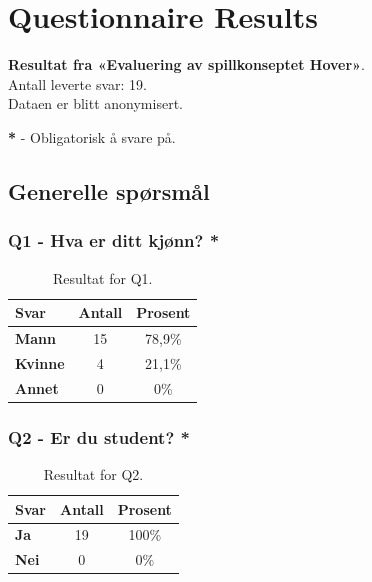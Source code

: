 \section{Questionnaire Results}
\label{appendix:questionnaire_results}
\textbf{Resultat fra «Evaluering av spillkonseptet Hover»}.\\
Antall leverte svar: 19. \\
Dataen er blitt anonymisert.

\textbf{*} - Obligatorisk å svare på.

\subsection*{Generelle spørsmål}
\subsubsection*{Q1 - Hva er ditt kjønn? *}
  \begin{table}[H]     \small
    \centering
    \begin{tabularx}{0.4\textwidth}{|>{\bfseries}X|c|c|}
        \hline
        \textbf{Svar} & \textbf{Antall} & \textbf{Prosent}  \\  \hline
        Mann & 15 & 78,9\%  \\ 
        Kvinne & 4 & 21,1\%  \\ 
        Annet & 0 & 0\% \\
         \hline
    \end{tabularx}
    \caption{Resultat for Q1.}
\end{table}

\subsubsection*{Q2 - Er du student? *}
 \begin{table}[H]
    \centering
    \begin{tabularx}{0.4\textwidth}{|>{\bfseries}X|c|c|}
        \hline
        \textbf{Svar} & \textbf{Antall} & \textbf{Prosent}  \\  \hline
        Ja & 19 & 100\%  \\ 
        Nei & 0 & 0\% \\ 
        \hline
    \end{tabularx}
    \caption{Resultat for Q2.}
\end{table}

